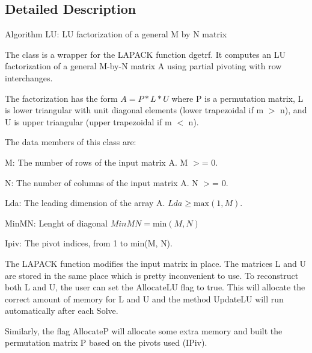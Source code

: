 \subsection{Detailed Description}
Algorithm L\+U\+: L\+U factorization of a general M by N matrix

The class is a wrapper for the L\+A\+P\+A\+C\+K function dgetrf. It computes an L\+U factorization of a general M-\/by-\/\+N matrix A using partial pivoting with row interchanges.

The factorization has the form $ A = P * L * U $ where P is a permutation matrix, L is lower triangular with unit diagonal elements (lower trapezoidal if m $>$ n), and U is upper triangular (upper trapezoidal if m $<$ n).

The data members of this class are\+:


\begin{DoxyItemize}
\item M\+: The number of rows of the input matrix A. M $>$= 0.
\item N\+: The number of columns of the input matrix A. N $>$= 0.
\item Lda\+: The leading dimension of the array A. $ Lda \geq \mbox{max}(1,M) $.
\item Min\+M\+N\+: Lenght of diagonal $ MinMN = \mbox{min}(M,N)$
\item Ipiv\+: The pivot indices, from 1 to min(\+M, N).
\end{DoxyItemize}

The L\+A\+P\+A\+C\+K function modifies the input matrix in place. The matrices L and U are stored in the same place which is pretty inconvenient to use. To reconstruct both L and U, the user can set the Allocate\+L\+U flag to true. This will allocate the correct amount of memory for L and U and the method Update\+L\+U will run automatically after each Solve.

Similarly, the flag Allocate\+P will allocate some extra memory and built the permutation matrix P based on the pivots used (I\+Piv).

